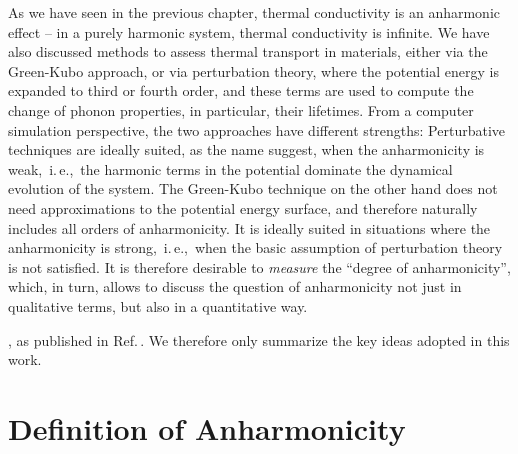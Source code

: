 \label{chp:anharmonicity}

As we have seen in the previous chapter, thermal conductivity is an anharmonic effect -- in a purely harmonic system, thermal conductivity is infinite. We have also discussed methods to assess thermal transport in materials, either via the Green-Kubo approach, or via perturbation theory, where the potential energy is expanded to third or fourth order, and these terms are used to compute the change of phonon properties, in particular, their lifetimes.
From a computer simulation perspective, the two approaches have different strengths: Perturbative techniques are ideally suited, as the name suggest, when the anharmonicity is weak,~i.\,e.,~the harmonic terms in the potential dominate the dynamical evolution of the system. The Green-Kubo technique on the other hand does not need approximations to the potential energy surface, and therefore naturally includes all orders of anharmonicity. It is ideally suited in situations where the anharmonicity is strong,~i.\,e.,~when the basic assumption of perturbation theory is not satisfied. It is therefore desirable to \emph{measure} the ``degree of anharmonicity'', which, in turn, allows to discuss the question of anharmonicity not just in qualitative terms, but also in a quantitative way.

, as published in Ref.\,\cite{Knoop2020}. We therefore only summarize the key ideas adopted in this work.

\section{Definition of Anharmonicity}

